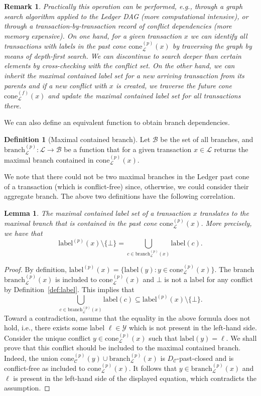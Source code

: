 \documentclass[11pt]{article}
\newcommand{\branch}{\mathrm{branch}}
\newcommand{\lab}{\mathrm{label}}
\newcommand{\branchset}{\mathcal{B}}
\newcommand{\conflictset}{\mathcal{C}}
\newcommand{\ledger}{\mathcal{L}}
\newcommand{\ConflictDAG}{D_{\conflictset}}
\newcommand{\cone}[3]{\mathrm{cone}_{#2}^{(#1)}\left(#3\right)}
\theoremstyle{plain}
\newtheorem{lemma}{Lemma}
\newtheorem{remark}{Remark}
\theoremstyle{definition}
\newtheorem{definition}{Definition}
\numberwithin{definition}{section}
\numberwithin{lemma}{section}
\numberwithin{ass}{section}
\numberwithin{remark}{section}
\numberwithin{example}{section}
\numberwithin{proposition}{section}
\numberwithin{theorem}{section}
\begin{document}
\begin{remark} \label{rem: how to update the set of labels}
Practically this operation can be performed, e.g., through a graph search algorithm applied to the Ledger DAG (more computational intensive), or through a transaction-by-transaction record of conflict dependencies (more memory expensive). On one hand, for a given transaction $x$ we can identify all transactions with labels in the past cone $\cone{p}{\ledger}{x}$ by traversing the graph by means of  depth-first search. We can discontinue to search deeper than certain elements by cross-checking with the conflict set.  On the other hand, we can  inherit the maximal contained label set for a new arriving transaction from its parents and if a new conflict with $x$ is created, we traverse the future cone $\cone{f}{\ledger}{x}$ and update the maximal contained label set for all transactions there. 
\end{remark}


We can also define an equivalent function to obtain branch dependencies.
\begin{definition}[Maximal contained branch]
Let $\branchset$ be the set of all branches, and $\branch^{(p)}_{\ledger}: \ledger \to \branchset$ be a function that for a given transaction $x\in \ledger$ returns the maximal branch contained in $\cone{p}{\ledger}{x}$. 
\end{definition}
We note that there could not be two maximal branches in the Ledger past cone of a transaction (which is conflict-free) since, otherwise, we could consider their aggregate branch.
The above two definitions have the following correlation.
\begin{lemma}
The maximal contained label set of a transaction $x$ translates to the maximal branch that is contained in the past cone $\cone{p}{\ledger}{x}$. More precisely, we have that \[\lab^{(p)} (x)\setminus\{\bot\} =  \bigcup_{c \in \branch^{(p)}_{\ledger} (x)}  \lab(c).\]
\end{lemma}

\begin{proof}
By definition, $\lab^{(p)}(x)=\{\lab(y): y\in \cone{p}{\ledger}{x}\}$. The branch $\branch^{(p)}_{\ledger} (x)$ is included to $\cone{p}{\ledger}{x}$ and $\bot$ is not a label for any conflict by Definition~\ref{def:label}. This implies that 
$$
\bigcup_{c \in \branch^{(p)}_{\ledger} (x)}  \lab(c) \subseteq \lab^{(p)} (x) \setminus \{\bot\}. 
$$
Toward a contradiction, assume that the equality in the above formula does not hold, i.e., there exists some label $\ell\in \mathcal{Y}$ which is not present in the left-hand side. Consider the unique conflict $y\in \cone{p}{\ledger}{x}$ such that $\lab(y)=\ell$. We shall prove that this conflict should be included to the maximal contained branch. Indeed, the union $\cone{p}{\conflictset}{y}\cup \branch^{(p)}_{\ledger}(x)$ is $\ConflictDAG$-past-closed and is conflict-free as included to $\cone{p}{\ledger}{x}$. It follows that $y\in \branch^{(p)}_{\ledger}(x)$ and $\ell$ is present in the left-hand side of the displayed equation, which contradicts the assumption.
\end{proof}
\end{document}
